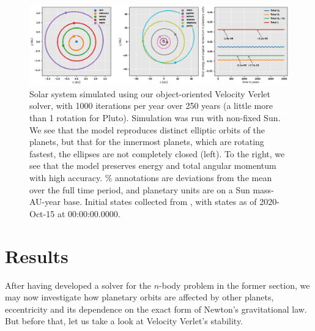 \documentclass[]{article}
\begin{document}
\begin{figure}[!htb]
	\centering
	\includegraphics[width=1\linewidth]{solar-system.png}
	\caption{Solar system simulated using our object-oriented Velocity Verlet solver, with 1000 iterations per year over 250 years (a little more than 1 rotation for Pluto). Simulation was run with non-fixed Sun. We see that the model reproduces distinct elliptic orbits of the planets, but that for the innermost planets, which are rotating fastest, the ellipses are not completely closed (left). To the right, we see that the model preserves energy and total angular momentum with high accuracy. \% annotations are deviations from the mean over the full time period, and planetary units are on a Sun mass-AU-year base. Initial states collected from \cite{nasa-jpl}, with states as of 2020-Oct-15 at 00:00:00.0000.}
	\label{fig:solar-system}
\end{figure}


\section{Results} \label{results}
After having developed a solver for the $n$-body problem in the former section, we may now investigate how planetary orbits are affected by other planets, eccentricity and its dependence on the exact form of Newton's gravitational law. But before that, let us take a look at Velocity Verlet's stability.
\end{document}
